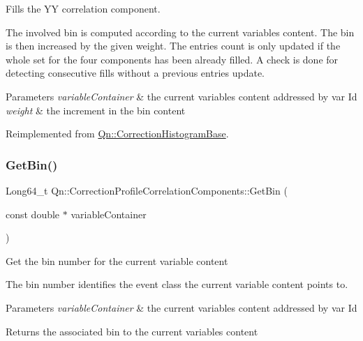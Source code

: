 Fills the YY correlation component.

The involved bin is computed according to the current variables content. The bin is then increased by the given weight. The entries count is only updated if the whole set for the four components has been already filled. A check is done for detecting consecutive fills without a previous entries update.


\begin{DoxyParams}{Parameters}
{\em variable\+Container} & the current variables content addressed by var Id \\
\hline
{\em weight} & the increment in the bin content \\
\hline
\end{DoxyParams}


Reimplemented from \mbox{\hyperlink{classQn_1_1CorrectionHistogramBase_a06e19e77ff3ba40039b3e1d84ad7a227}{Qn\+::\+Correction\+Histogram\+Base}}.

\mbox{\label{classQn_1_1CorrectionProfileCorrelationComponents_a0e45d5f8e12af86c557aad48e07198a4}} 
\subsubsection{\texorpdfstring{Get\+Bin()}{GetBin()}}
{\footnotesize\ttfamily Long64\+\_\+t Qn\+::\+Correction\+Profile\+Correlation\+Components\+::\+Get\+Bin (\begin{DoxyParamCaption}\item[{const double $\ast$}]{variable\+Container }\end{DoxyParamCaption})\hspace{0.3cm}{\ttfamily [virtual]}}

Get the bin number for the current variable content

The bin number identifies the event class the current variable content points to.


\begin{DoxyParams}{Parameters}
{\em variable\+Container} & the current variables content addressed by var Id \\
\hline
\end{DoxyParams}
\begin{DoxyReturn}{Returns}
the associated bin to the current variables content 
\end{DoxyReturn}


